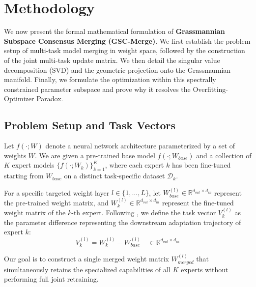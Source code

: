 \section{Methodology}
\label{sec:method}

We now present the formal mathematical formulation of \textbf{Grassmannian Subspace Consensus Merging (GSC-Merge)}. We first establish the problem setup of multi-task model merging in weight space, followed by the construction of the joint multi-task update matrix. We then detail the singular value decomposition (SVD) and the geometric projection onto the Grassmannian manifold. Finally, we formulate the optimization within this spectrally constrained parameter subspace and prove why it resolves the Overfitting-Optimizer Paradox.

\subsection{Problem Setup and Task Vectors}
Let $f(\cdot; W)$ denote a neural network architecture parameterized by a set of weights $W$. We are given a pre-trained base model $f(\cdot; W_{base})$ and a collection of $K$ expert models $\{f(\cdot; W_k)\}_{k=1}^K$, where each expert $k$ has been fine-tuned starting from $W_{base}$ on a distinct task-specific dataset $\mathcal{D}_k$.

For a specific targeted weight layer $l \in \{1, \dots, L\}$, let $W_{base}^{(l)} \in \mathbb{R}^{d_{out} \times d_{in}}$ represent the pre-trained weight matrix, and $W_k^{(l)} \in \mathbb{R}^{d_{out} \times d_{in}}$ represent the fine-tuned weight matrix of the $k$-th expert. Following \citet{ilharco2022editing}, we define the task vector $V_k^{(l)}$ as the parameter difference representing the downstream adaptation trajectory of expert $k$:
\begin{equation}
    V_k^{(l)} = W_k^{(l)} - W_{base}^{(l)} \quad \in \mathbb{R}^{d_{out} \times d_{in}}
\end{equation}

Our goal is to construct a single merged weight matrix $W_{merged}^{(l)}$ that simultaneously retains the specialized capabilities of all $K$ experts without performing full joint retraining.

